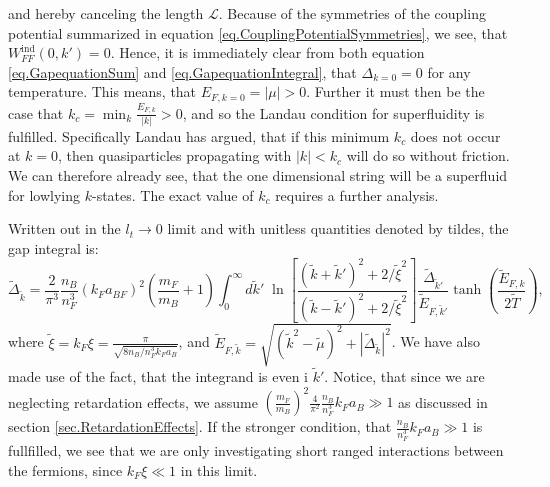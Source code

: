 and hereby canceling the length $\mathcal{L}$. Because of the symmetries of the coupling potential summarized in equation \eqref{eq.CouplingPotentialSymmetries}, we see, that $W^\text{ind}_{FF}(0,k') = 0$. Hence, it is immediately clear from both equation \eqref{eq.GapequationSum} and \eqref{eq.GapequationIntegral}, that $\Delta_{k=0} = 0$ for any temperature. This means, that $E_{F,k=0} = |\mu| > 0$. Further it must then be the case that $k_c = \min_k \frac{E_{F,k}}{|k|} > 0$, and so the Landau condition for superfluidity is fulfilled\cite{LandauStatPhys2,PlischkeStatPhys}.
Specifically Landau has argued, that if this minimum $k_c$ does not occur at $k=0$, then quasiparticles propagating with $|k|< k_c$ will do so without friction. We can therefore already see, that the one dimensional string will be a superfluid for lowlying $k$-states. The exact value of $k_c$ requires a further analysis. 

Written out in the $l_t \to 0$ limit and with unitless quantities denoted by tildes, the gap integral is:
\begin{equation}
\tilde{\Delta}_{\tilde{k}} = \frac{2}{\pi^3}\frac{n_B}{n_F^3}(k_Fa_{BF})^2\left(\frac{m_F}{m_B} + 1\right) \int_0^\infty d\tilde{k}' \; \ln\left[\frac{(\tilde{k}+\tilde{k}')^2+2/\tilde{\xi}^2}{(\tilde{k}-\tilde{k}')^2+2/\tilde{\xi}^2}\right] \frac{\tilde{\Delta}_{\tilde{k}'}}{\tilde{E}_{F,\tilde{k}'}}\tanh\left(\frac{\tilde{E}_{F,k}}{2\tilde{T}}\right),
\label{eq.GapequationIntegralUnitless}
\end{equation} 
where $\tilde{\xi} = k_F\xi = \frac{\pi}{\sqrt{8 n_B/n_F^3 k_Fa_B}}$, and $\tilde{E}_{F,\tilde{k}} = \sqrt{(\tilde{k}^2-\tilde{\mu})^2 + |\tilde{\Delta}_{\tilde{k}}|^2}$. We have also made use of the fact, that the integrand is even i $\tilde{k}'$. Notice, that since we are neglecting retardation effects, we assume $\left(\frac{m_F}{m_B}\right)^2\frac{4}{\pi^2}\frac{n_B}{n_F^3}k_Fa_B \gg 1$ as discussed in section \ref{sec.RetardationEffects}. If the stronger condition, that $\frac{n_B}{n_F^3}k_Fa_B \gg 1$ is fullfilled, we see that we are only investigating short ranged interactions between the fermions, since $k_F\xi \ll 1$ in this limit. 

